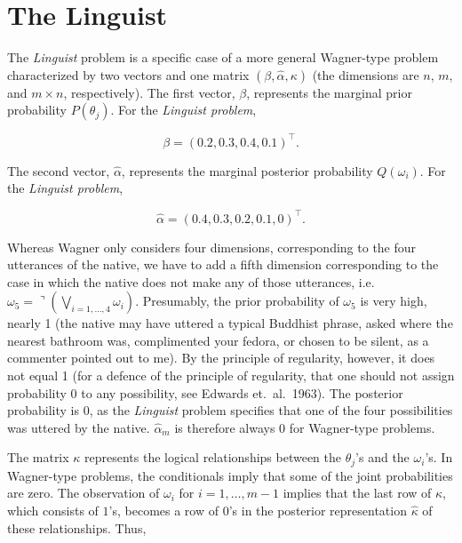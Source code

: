 \documentclass[11pt]{article}
\begin{document}
\section{The Linguist}
\label{TheLinguist}

The \emph{Linguist} problem is a specific case of a more general
Wagner-type problem characterized by two vectors and one matrix
$(\beta,\hat{\alpha},\kappa)$ (the dimensions are $n$, $m$, and
$m\times{}n$, respectively). The first vector, $\beta$, represents
the marginal prior probability $P(\theta_{j})$. For the \emph{Linguist
problem},

\begin{equation}
  \label{eq:p1}
  \beta=(0.2,0.3,0.4,0.1)^{\intercal}.
\end{equation}

The second vector, $\hat{\alpha}$, represents the marginal posterior
probability $Q(\omega_{i})$. For the \emph{Linguist problem},

\begin{equation}
  \label{eq:p2}
  \hat{\alpha}=(0.4,0.3,0.2,0.1,0)^{\intercal}.
\end{equation}

Whereas Wagner only considers four dimensions, corresponding to the
four utterances of the native, we have to add a fifth dimension
corresponding to the case in which the native does not make any of
those utterances, i.e.\
$\omega_{5}=\urcorner(\bigvee_{i=1,\ldots,4}\omega_{i})$. Presumably,
the prior probability of $\omega_{5}$ is very high, nearly 1 (the
native may have uttered a typical Buddhist phrase, asked where the
nearest bathroom was, complimented your fedora, or chosen to be
silent, as a commenter pointed out to me). By the principle of
regularity, however, it does not equal 1 (for a defence of the
principle of regularity, that one should not assign probability 0 to
any possibility, see Edwards et.\ al.\ 1963). The posterior
probability is $0$, as the \emph{Linguist} problem specifies that one
of the four possibilities was uttered by the native.
$\hat{\alpha}_{m}$ is therefore always $0$ for Wagner-type problems.

The matrix $\kappa$ represents the logical relationships between the
$\theta_{j}$'s and the $\omega_{i}$'s. In Wagner-type problems, the
conditionals imply that some of the joint probabilities are zero. The
observation of $\omega_{i}$ for $i=1,\ldots,m-1$ implies that the last
row of $\kappa$, which consists of $1$'s, becomes a row of $0$'s in
the posterior representation $\hat{\kappa}$ of these relationships.
Thus,
\end{document}
